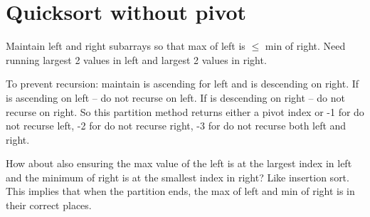 \section{Quicksort without pivot}

Maintain left and right subarrays so that max of left is $\leq$
min of right.
Need running largest 2 values in left and largest 2 values in right.

To prevent recursion: maintain is ascending for left
and is descending on right.
If is ascending on left -- do not recurse on left.
If is descending on right --  do not recurse on right.
So this partition method returns either a pivot index or
-1 for do not recurse left,
-2 for do not recurse right,
-3 for do not recurse both left and right.

How about also ensuring the max value of the left is at the largest index
in left
and the minimum of right is at the smallest index in right?
Like insertion sort.
This implies that when the partition ends, the max of left
and min of right is in their correct places.
